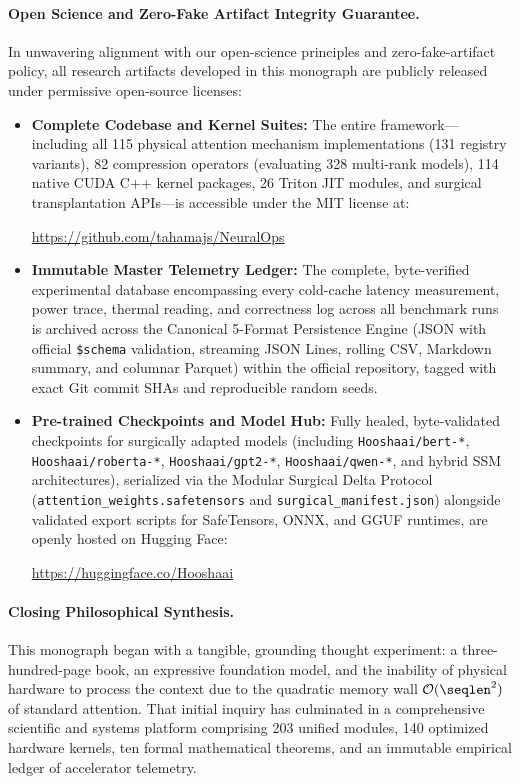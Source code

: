 \paragraph{Open Science and Zero-Fake Artifact Integrity Guarantee.}
In unwavering alignment with our open-science principles and zero-fake-artifact policy, all research artifacts developed in this monograph are publicly released under permissive open-source licenses:
\begin{itemize}
    \item \textbf{Complete Codebase and Kernel Suites:}
    The entire \neuralops{} framework—including all 115 physical attention mechanism implementations (131 registry variants), 82 compression operators (evaluating 328 multi-rank models), 114 native CUDA C++ kernel packages, 26 Triton JIT modules, and surgical transplantation APIs—is accessible under the MIT license at:
    \begin{center}
        \url{https://github.com/tahamajs/NeuralOps}
    \end{center}
    \item \textbf{Immutable Master Telemetry Ledger:}
    The complete, byte-verified experimental database encompassing every cold-cache latency measurement, power trace, thermal reading, and correctness log across all benchmark runs is archived across the Canonical 5-Format Persistence Engine (JSON with official \texttt{\$schema} validation, streaming JSON Lines, rolling CSV, Markdown summary, and columnar Parquet) within the official repository, tagged with exact Git commit SHAs and reproducible random seeds.
    \item \textbf{Pre-trained Checkpoints and Model Hub:}
    Fully healed, byte-validated checkpoints for surgically adapted models (including \texttt{Hooshaai/bert-*}, \texttt{Hooshaai/roberta-*}, \texttt{Hooshaai/gpt2-*}, \texttt{Hooshaai/qwen-*}, and hybrid SSM architectures), serialized via the Modular Surgical Delta Protocol (\texttt{attention\_weights.safetensors} and \texttt{surgical\_manifest.json}) alongside validated export scripts for SafeTensors, ONNX, and GGUF runtimes, are openly hosted on Hugging Face:
    \begin{center}
        \url{https://huggingface.co/Hooshaai}
    \end{center}
\end{itemize}

\paragraph{Closing Philosophical Synthesis.}
This monograph began with a tangible, grounding thought experiment: a three-hundred-page book, an expressive foundation model, and the inability of physical hardware to process the context due to the quadratic memory wall $\mathcal{O}(\seqlen^2)$ of standard attention.
That initial inquiry has culminated in a comprehensive scientific and systems platform comprising 203 unified modules, 140 optimized hardware kernels, ten formal mathematical theorems, and an immutable empirical ledger of accelerator telemetry.

